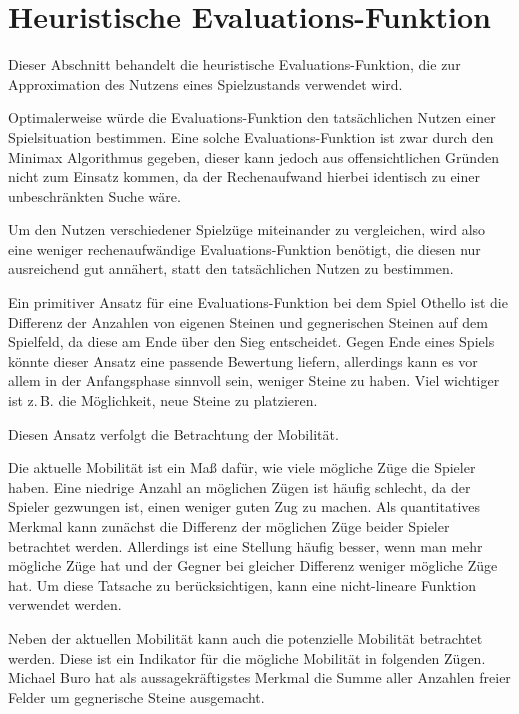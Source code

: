 \section{Heuristische Evaluations-Funktion}
\label{sec:heuristic}
Dieser Abschnitt behandelt die heuristische Evaluations-Funktion, die zur Approximation des Nutzens eines Spielzustands
verwendet wird.

Optimalerweise würde die Evaluations-Funktion den tatsächlichen Nutzen einer Spielsituation bestimmen. Eine solche
Evaluations-Funktion ist zwar durch den Minimax Algorithmus gegeben, dieser kann jedoch aus offensichtlichen Gründen
nicht zum Einsatz kommen, da der Rechenaufwand hierbei identisch zu einer unbeschränkten Suche wäre.

Um den Nutzen verschiedener Spielzüge miteinander zu vergleichen, wird also eine weniger rechenaufwändige
Evaluations-Funktion benötigt, die diesen nur ausreichend gut annähert, statt den tatsächlichen Nutzen zu bestimmen.

Ein primitiver Ansatz für eine Evaluations-Funktion bei dem Spiel Othello ist die Differenz der Anzahlen von eigenen
Steinen und gegnerischen Steinen auf dem Spielfeld, da diese am Ende über den Sieg entscheidet. Gegen Ende eines Spiels
könnte dieser Ansatz eine passende Bewertung liefern, allerdings kann es vor allem in der Anfangsphase sinnvoll sein,
weniger Steine zu haben. Viel wichtiger ist z.\,B. die Möglichkeit, neue Steine zu platzieren.

Diesen Ansatz verfolgt die Betrachtung der Mobilität.

Die aktuelle Mobilität ist ein Maß dafür, wie viele mögliche Züge die Spieler haben. Eine niedrige Anzahl an möglichen
Zügen ist häufig schlecht, da der Spieler gezwungen ist, einen weniger guten Zug zu machen. Als quantitatives Merkmal
kann zunächst die Differenz der möglichen Züge beider Spieler betrachtet werden. Allerdings ist eine Stellung häufig
besser, wenn man mehr mögliche Züge hat und der Gegner bei gleicher Differenz weniger mögliche Züge hat. Um diese
Tatsache zu berücksichtigen, kann eine nicht-lineare Funktion verwendet werden.
\cite[S. 7]{evaluationfunctions}

Neben der aktuellen Mobilität kann auch die potenzielle Mobilität betrachtet werden. Diese ist ein Indikator für die
mögliche Mobilität in folgenden Zügen. Michael Buro hat als aussagekräftigstes Merkmal die Summe aller Anzahlen freier
Felder um gegnerische Steine ausgemacht.
\cite[S. 8f.]{evaluationfunctions}

